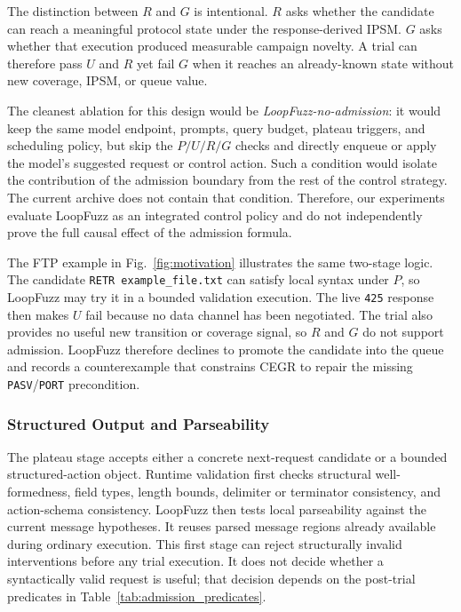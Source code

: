 \documentclass[final,5p,times,number]{elsarticle}
\begin{document}
The distinction between $R$ and $G$ is intentional. $R$ asks whether the candidate can reach a meaningful protocol state under the response-derived IPSM. $G$ asks whether that execution produced measurable campaign novelty. A trial can therefore pass $U$ and $R$ yet fail $G$ when it reaches an already-known state without new coverage, IPSM, or queue value.

The cleanest ablation for this design would be \emph{LoopFuzz-no-admission}: it would keep the same model endpoint, prompts, query budget, plateau triggers, and scheduling policy, but skip the $P/U/R/G$ checks and directly enqueue or apply the model's suggested request or control action. Such a condition would isolate the contribution of the admission boundary from the rest of the control strategy. The current archive does not contain that condition. Therefore, our experiments evaluate LoopFuzz as an integrated control policy and do not independently prove the full causal effect of the admission formula.

The FTP example in Fig.~\ref{fig:motivation} illustrates the same two-stage logic. The candidate \texttt{RETR example\_file.txt} can satisfy local syntax under $P$, so LoopFuzz may try it in a bounded validation execution. The live \texttt{425} response then makes $U$ fail because no data channel has been negotiated. The trial also provides no useful new transition or coverage signal, so $R$ and $G$ do not support admission. LoopFuzz therefore declines to promote the candidate into the queue and records a counterexample that constrains CEGR to repair the missing \texttt{PASV}/\texttt{PORT} precondition.

\subsubsection{Structured Output and Parseability}
The plateau stage accepts either a concrete next-request candidate or a bounded structured-action object. Runtime validation first checks structural well-formedness, field types, length bounds, delimiter or terminator consistency, and action-schema consistency. LoopFuzz then tests local parseability against the current message hypotheses. It reuses parsed message regions already available during ordinary execution. This first stage can reject structurally invalid interventions before any trial execution. It does not decide whether a syntactically valid request is useful; that decision depends on the post-trial predicates in Table~\ref{tab:admission_predicates}.
\end{document}
